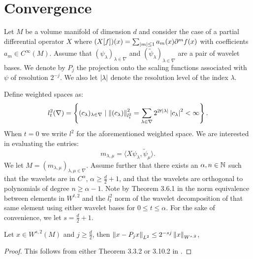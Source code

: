 \section{Convergence}

Let $M$ be a volume manifold of dimension $d$ and consider the case of a partial differential operator $X$ where $(X [f] )(x) = \sum_{\left| m \right|\leq 1} a_m(x) \partial^m f(x)$ with coefficients $a_m \in C^{\infty}(M)$. Assume that $(\psi_\lambda)_{\lambda \in \nabla}$ and $(\tilde{\psi}_\lambda)_{\lambda \in \nabla}$ are a pair of wavelet bases. We denote by $P_j$ the projection onto the scaling functions associated with $\psi$ of resolution $2^{-j}$. We also let ${\lvert\lambda\rvert}$ denote the resolution level of the index $\lambda$. 

Define weighted spaces as:
\begin{equation}
	l_t^2(\nabla) = \left\{ (c_\lambda)_{\lambda\in\nabla} \mid \left\| (c_\lambda) \right\|_{l^2_t}^2 = \sum_{\lambda \in \nabla} 2^{2t{\lvert\lambda\rvert}}\left| c_\lambda \right|^2 < \infty  \right\}.
\end{equation}
When $t = 0$ we write $l^2$ for the aforementioned weighted space. We are interested in evaluating the entries:
\begin{equation}
	m_{\lambda,\mu} = \langle X \psi_\lambda, \tilde{\psi}_\mu \rangle.
\end{equation}
We let $M=(m_{\lambda,\mu})_{\lambda,\mu \in \nabla}$. Assume further that there exists an $\alpha,n \in \mathbb{N}$ such that the wavelets are in $C^{\alpha}$, $\alpha \geq \frac{d}{2} + 1$, and that the wavelets are orthogonal to polynomials of degree $n \geq \alpha - 1$.  Note by Theorem 3.6.1 in \cite{Cohen2003} the norm equivalence between elements in $W^{t,2}$ and the $l_t^2$ norm of the wavelet decomposition of that same element using either wavelet bases for $0\leq t \leq \alpha$. For the sake of convenience, we let $s = \frac{d}{2} + 1$. 

\begin{lemma} \label{lem:projection_bound}
	Let $x \in W^{s,2}(M)$ and $j \geq \frac{d}{2}$, then $\left\| x - P_j x \right\|_{L^2} \leq  2^{-sj}\left\| x \right\|_{W^{s,2}}$,
\end{lemma}
\begin{proof}
	This follows from either Theorem 3.3.2 or 3.10.2 in \cite{Cohen2003}.
\end{proof}

